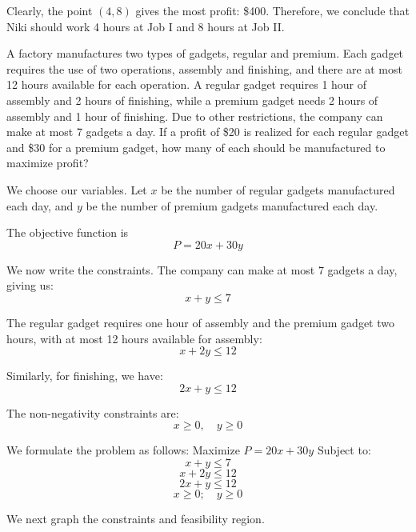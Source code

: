 Clearly, the point $(4, 8)$ gives the most profit: \$400. Therefore, we conclude that Niki should work 4 hours at Job I and 8 hours at Job II.


\begin{example} \label{3line_geometric_method_example}
    A factory manufactures two types of gadgets, regular and premium. Each gadget requires the use of two operations, assembly and finishing, and there are at most 12 hours available for each operation. A regular gadget requires 1 hour of assembly and 2 hours of finishing, while a premium gadget needs 2 hours of assembly and 1 hour of finishing. Due to other restrictions, the company can make at most 7 gadgets a day. If a profit of \$20 is realized for each regular gadget and \$30 for a premium gadget, how many of each should be manufactured to maximize profit?
\end{example}

\begin{solution}
    We choose our variables.
    Let \( x \) be the number of regular gadgets manufactured each day,
    and \( y \) be the number of premium gadgets manufactured each day.

    The objective function is
    \[ P = 20x + 30y \]

    We now write the constraints. The company can make at most 7 gadgets a day, giving us:
    \[ x + y \leq 7 \]

    The regular gadget requires one hour of assembly and the premium gadget two hours, with at most 12 hours available for assembly:
    \[ x + 2y \leq 12 \]

    Similarly, for finishing, we have:
    \[ 2x + y \leq 12 \]

    The non-negativity constraints are:
    \[ x \geq 0, \quad y \geq 0 \]

    We formulate the problem as follows:
    Maximize \( P = 20x + 30y \)
    Subject to:
    \[ x + y \leq 7 \]
    \[ x + 2y \leq 12 \]
    \[ 2x + y \leq 12 \]
    \[ x \geq 0; \quad y \geq 0 \]

    We next graph the constraints and feasibility region.
\end{solution}


